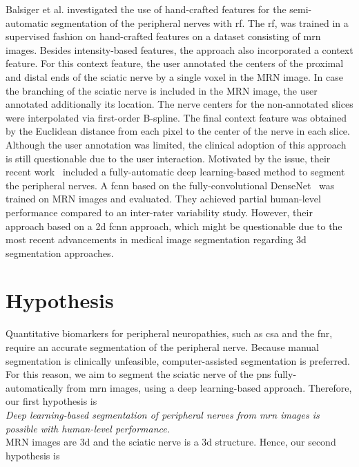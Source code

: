 Balsiger et al. investigated the use of hand-crafted features for the semi-automatic segmentation of the peripheral nerves with \gls{rf}. The \gls{rf}, was trained in a supervised fashion on hand-crafted features on a dataset consisting of \gls{mrn} images. Besides intensity-based features, the approach also incorporated a context feature. For this context feature, the user annotated the centers of the proximal and distal ends of the sciatic nerve by a single voxel in the MRN image. In case the branching of the sciatic nerve is included in the MRN image, the user annotated additionally its location. The nerve centers for the non-annotated slices were interpolated via first-order B-spline. The final context feature was obtained by the Euclidean distance from each pixel to the center of the nerve in each slice. Although the user annotation was limited, the clinical adoption of this approach is still questionable due to the user interaction. Motivated by the issue, their recent work~\cite{Balsiger2018SegmentationApproach} included a  fully-automatic deep learning-based method to segment the peripheral nerves. A \gls{fcnn} based on the fully-convolutional DenseNet~\cite{Huang2017DenselyNetworks} was trained on MRN images and evaluated. They achieved partial human-level performance compared to an inter-rater variability study. However, their approach based on a \gls{2d} \gls{fcnn} approach, which might be questionable due to the most recent advancements in medical image segmentation regarding \gls{3d} segmentation approaches. 

\section{Hypothesis} %
Quantitative biomarkers for peripheral neuropathies, such as \gls{csa} and the \gls{fnr}, require an accurate segmentation of the peripheral nerve. Because manual segmentation is clinically unfeasible, computer-assisted segmentation is preferred.
For this reason, we aim to segment the sciatic nerve of the \gls{pns} fully-automatically from \acrshort{mrn} images, using a deep learning-based approach. Therefore, our first hypothesis is\\

\textit{Deep learning-based segmentation of peripheral nerves from \gls{mrn} images is possible with human-level performance.} \\

MRN images are \gls{3d} and the sciatic nerve is a \gls{3d} structure. Hence, our second hypothesis is\\


